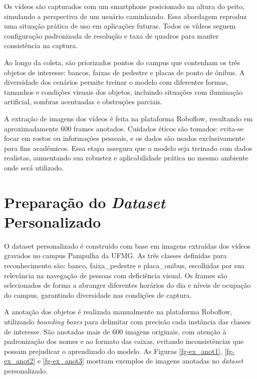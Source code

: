 Os vídeos são capturados com um smartphone posicionado na altura do peito, simulando a perspectiva de um usuário caminhando. Essa abordagem reproduz uma situação prática de uso em aplicações futuras. Todos os vídeos seguem configuração padronizada de resolução e taxa de quadros para manter consistência na captura.

Ao longo da coleta, são priorizados pontos do campus que contenham os três objetos de interesse: bancos, faixas de pedestre e placas de ponto de ônibus. A diversidade dos cenários permite treinar o modelo com diferentes formas, tamanhos e condições visuais dos objetos, incluindo situações com iluminação artificial, sombras acentuadas e obstruções parciais.

A extração de imagens dos vídeos é feita na plataforma Roboflow, resultando em aproximadamente 600 frames anotados. Cuidados éticos são tomados: evita-se focar em rostos ou informações pessoais, e os dados são usados exclusivamente para fins acadêmicos. Essa etapa assegura que o modelo seja treinado com dados realistas, aumentando sua robustez e aplicabilidade prática no mesmo ambiente onde será utilizado.

\section{\textbf{Preparação do \textit{Dataset} Personalizado}}

O dataset personalizado é construído com base em imagens extraídas dos vídeos gravados no campus Pampulha da UFMG. As três classes definidas para reconhecimento são: banco, faixa\_pedestre e placa\_onibus, escolhidas por sua relevância na navegação de pessoas com deficiência visual. Os frames são selecionados de forma a abranger diferentes horários do dia e níveis de ocupação do campus, garantindo diversidade nas condições de captura.

A anotação dos objetos é realizada manualmente na plataforma Roboflow, utilizando \textit{bounding boxes} para delimitar com precisão cada instância das classes de interesse. São anotadas mais de 600 imagens originais, com atenção à padronização dos nomes e ao formato das caixas, evitando inconsistências que possam prejudicar o aprendizado do modelo. As Figuras \ref{fg-ex_anot1}, \ref{fg-ex_anot2} e \ref{fg-ex_anot3} mostram exemplos de imagens anotadas no \textit{dataset} personalizado.

